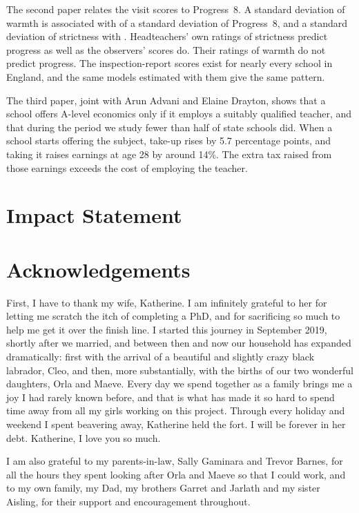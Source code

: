 \documentclass[12pt, a4paper]{report}
\begin{document}
The second paper relates the visit scores to Progress~8. A standard
deviation of warmth is associated with \PrimarySpecWSD{} of a standard
deviation of Progress~8, and a standard deviation of strictness with
\PrimarySpecSSD{}. Headteachers' own ratings of strictness predict progress
as well as the observers' scores do. Their ratings of warmth do not predict
progress. The inspection-report scores exist for nearly every school in
England, and the same models estimated with them give the same pattern.

The third paper, joint with Arun Advani and Elaine Drayton, shows that a
school offers A-level economics only if it employs a suitably qualified
teacher, and that during the period we study fewer than
half of state schools did. When a school starts offering the subject,
take-up rises by 5.7 percentage points, and taking it raises earnings at
age 28 by around 14\%. The extra tax raised from those earnings
exceeds the cost of employing the teacher.

\chapter*{Impact Statement}




\chapter*{Acknowledgements}

First, I have to thank my wife, Katherine. I am infinitely grateful to her
for letting me scratch the itch of completing a PhD, and for sacrificing so
much to help me get it over the finish line. I started this journey in
September 2019, shortly after we married, and between then and now our
household has expanded dramatically: first with the arrival of a beautiful
and slightly crazy black labrador, Cleo, and then, more substantially, with
the births of our two wonderful daughters, Orla and Maeve. Every day we
spend together as a family brings me a joy I had rarely known before, and
that is what has made it so hard to spend time away from all my girls
working on this project. Through every holiday and weekend I spent
beavering away, Katherine held the fort. I will be forever in her debt.
Katherine, I love you so much.

I am also grateful to my parents-in-law, Sally Gaminara and Trevor Barnes,
for all the hours they spent looking after Orla and Maeve so that I could
work, and to my own family, my Dad, my brothers Garret and Jarlath and my
sister Aisling, for their support and encouragement throughout.
\end{document}
